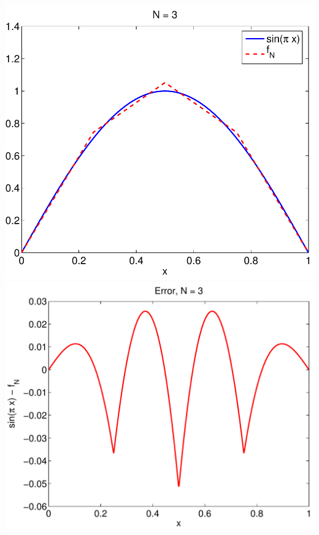 {\begin{solution}
\begin{enumerate}
\begin{center}
   \includegraphics[scale=0.4]{hats_3a}\quad 
   \includegraphics[scale=0.4]{hats_3b}


\end{center}
\end{enumerate}
\end{solution}}
